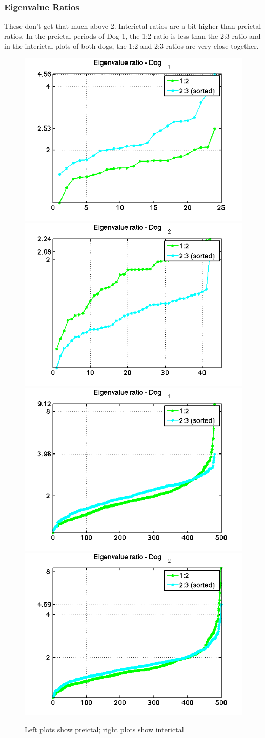 \documentclass[11pt]{article}
\begin{document}
\subsubsection{Eigenvalue Ratios}
These don't get that much above 2. Interictal ratios are a bit higher than preictal ratios. In the preictal periods of Dog 1, the 1:2 ratio is less than the 2:3 ratio and in the interictal plots of both dogs, the 1:2 and 2:3 ratios are very close together. 
\begin{figure}[H]
\centering
\includegraphics[width=.24\textwidth]{pictures/evalRat_pre1.png}
\includegraphics[width=.24\textwidth]{pictures/evalRat_pre2.png}
\hfill
\includegraphics[width=.24\textwidth]{pictures/evalRat_inter1.png}
\includegraphics[width=.24\textwidth]{pictures/evalRat_inter2.png}
\caption{Left plots show preictal; right plots show interictal}
\end{figure}
\end{document}
